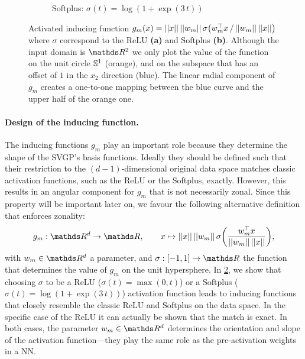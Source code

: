 \begin{figure}[t]
\begin{subfigure}[b]{0.49\textwidth}
        \caption{Softplus: $\sigma(t) = \log(1 + \exp(3\,t))$}
         \label{fig:projection:softplus}
     \end{subfigure}
   \caption{Activated inducing function ${g}_m(x) = \norm{x}\,\norm{w_m}\, \sigma\left( w_m^\top x \, / \, \norm{w_m}\,\norm{x}\right)$ where $\sigma$ correspond to the ReLU \textbf{(a)} and Softplus \textbf{(b)}. Although the input domain is $\Reals^2$ we only plot the value of the function on the unit circle $\mathbb{S}^1$ (orange), and on the subspace that has an offset of $1$ in the $x_2$ direction (blue). The linear radial component of ${g}_m$ creates a one-to-one mapping between the blue curve and the upper half of the orange one.}%
   \label{fig:projection}
\end{figure}

\paragraph{Design of the inducing function.}
The inducing functions $g_m$ play an important role because they determine the shape of the SVGP's basis functions. Ideally they should be defined such that their restriction to the $(d - 1)$-dimensional original data space matches classic activation functions, such as the ReLU or the Softplus, exactly. However, this results in an angular component for $g_m$ that is not necessarily zonal. Since this property will be important later on, we favour the following alternative definition that enforces zonality:
\begin{equation}
\label{eq:def-inducing-function}
    g_m: \Reals^d \rightarrow \Reals,\qquad x \mapsto \norm{x}\,\norm{w_m}\, \sigma\left(\frac{w_m^\top x}{\norm{w_m}\,\norm{x}}\right), 
\end{equation}
with $w_m \in \Reals^d$ a parameter, and $\sigma: [-1, 1] \rightarrow \Reals$ the function that determines the value of $g_m$ on the unit hypersphere. In \cref{fig:projection}, we show that choosing $\sigma$ to be a ReLU ($\sigma(t) = \max(0, t)$) or a Softplus ($\sigma(t) = \log(1 + \exp(3\,t))$) activation function leads to inducing functions that closely resemble the classic ReLU and Softplus on the data space. In the specific case of the ReLU it can actually be shown that the match is exact. In both cases, the parameter $w_m \in \Reals^d$ determines the orientation and slope of the activation function---they play the same role as the pre-activation weights in a NN.

